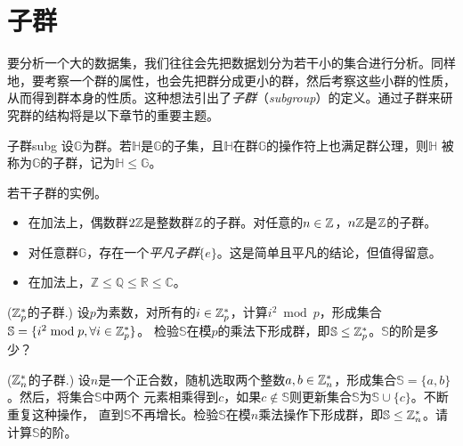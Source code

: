 \section{子群}
\label{sec:sub_gr}
要分析一个大的数据集，我们往往会先把数据划分为若干小的集合进行分析。同样地，要考察一个群的属性，也会先把群分成更小的群，然后考察这些小群的性质，从而得到群本身的性质。这种想法引出了\emph{子群}（\emph{subgroup}）的定义。通过子群来研究群的结构将是以下章节的重要主题。

\begin{definition}{子群}{subg}
    设$\mathbb{G}$为群。若$\mathbb{H}$是$\mathbb{G}$的子集，且$\mathbb{H}$在群$\mathbb{G}$的操作符上也满足群公理，则$\mathbb{H}$
	被称为$\mathbb{G}$的子群，记为$\mathbb{H}\leq \mathbb{G}$。
\end{definition}

	\begin{example}
若干子群的实例。
        \begin{itemize}
            \item 在加法上，偶数群$2{\mathbb Z}$是整数群${\mathbb Z}$的子群。对任意的$n \in {\mathbb Z}$，$n{\mathbb Z}$是${\mathbb Z}$的子群。
          
          	 \item 对任意群$\mathbb{G}$，存在一个\emph{平凡子群}$\{ e \}$。这是简单且平凡的结论，但值得留意。
          	 
          	 \item 在加法上，$\mathbb{Z} \leq \mathbb{Q} \leq \mathbb{R} \leq \mathbb{C}$。
          	 
        \end{itemize}
	\end{example}
	
\begin{example}{(${\mathbb Z}_p^*$的子群.)}
	\label{exm:zp}
	设$p$为素数，对所有的$i \in {\mathbb Z}_p^*$，计算$i^2 \bmod p$，形成集合$\mathbb{S} = \{ i^2 \bmod p, \forall i \in {\mathbb Z}_p^*\}$。
	检验$\mathbb{S}$在模$p$的乘法下形成群，即$\mathbb{S} \leq {\mathbb Z}_p^*$。$\mathbb{S}$的阶是多少？
\end{example}

\begin{example}{(${\mathbb Z}_n^*$的子群.)} 
	\label{exm:zn}
	设$n$是一个正合数，随机选取两个整数$a, b \in {\mathbb Z}_n^*$，形成集合$\mathbb{S} = \{ a, b\}$。然后，将集合$\mathbb{S}$中两个
	元素相乘得到$c$，如果$c \notin \mathbb{S}$则更新集合$\mathbb{S}$为$\mathbb{S} \cup \{c\}$。不断重复这种操作，
	直到$\mathbb{S}$不再增长。检验$\mathbb{S}$在模$n$乘法操作下形成群，即$\mathbb{S} \leq {\mathbb Z}_n^*$。请计算$\mathbb{S}$的阶。
\end{example}
	
